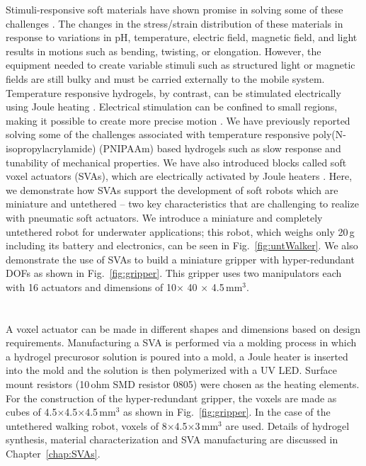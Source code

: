 Stimuli-responsive soft materials have shown promise in solving some of these challenges \cite{Steele2018, Stuart2010,White2013}. The changes in the stress/strain distribution of these materials in response to variations in pH, temperature, electric field, magnetic field, and light results in motions such as bending, twisting, or elongation. However, the equipment needed to create variable stimuli such as structured light \cite{Palagi2016} or magnetic fields \cite{Kim2018} are still bulky and must be carried externally to the mobile system. Temperature responsive hydrogels, by contrast, can be stimulated electrically using Joule heating \cite{Yu2013}. Electrical stimulation can be confined to small regions, making it possible to create more precise motion \cite{Richter2009}. We have previously reported solving some of the challenges associated with temperature responsive poly(N-isopropylacrylamide) (PNIPAAm) based hydrogels such as slow response and tunability of mechanical properties. We have also introduced blocks called soft voxel actuators (SVAs), which are electrically activated by Joule heaters \cite{Khodambashi2021}. Here, we demonstrate how SVAs support the development of soft robots which are miniature and untethered -- two key characteristics that are challenging to realize with pneumatic soft actuators. We introduce a miniature and completely untethered robot for underwater applications; this robot, which weighs only 20\,g including its battery and electronics, can be seen in Fig.~\ref{fig:untWalker}. We also demonstrate the use of SVAs to build a miniature gripper with hyper-redundant DOFs as shown in Fig.~\ref{fig:gripper}. This gripper uses two manipulators each with 16 actuators and dimensions of 10$\times$ 40 $\times$ 4.5\,mm$^3$. 

	
\section{}
A voxel actuator can be made in different shapes and dimensions based on design requirements. Manufacturing a SVA is performed via a molding process in which a hydrogel precurosor solution is poured into a mold, a Joule heater is inserted into the mold and the solution is then polymerized with a UV LED. Surface mount  resistors  (10\,ohm  SMD  resistor  0805) were chosen as the heating elements. For the construction of the hyper-redundant gripper, the voxels are made as cubes of 4.5$\times$4.5$\times$4.5\,mm$^3$ as shown in Fig.~\ref{fig:gripper}. In the case of the untethered walking robot, voxels of 8$\times$4.5$\times$3\,mm$^3$ are used. Details of hydrogel synthesis, material characterization and SVA manufacturing are discussed in Chapter~\ref{chap:SVAs}.

